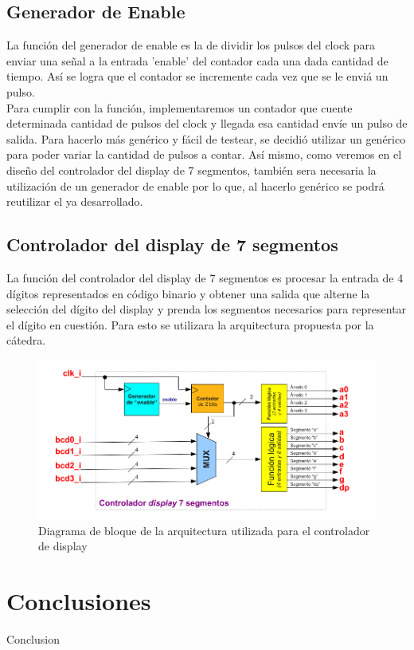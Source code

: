 \documentclass[a4paper,10pt]{article}
\begin{document}
	\subsection{Generador de Enable}
	La función del generador de enable es la de dividir los pulsos del clock para enviar una señal a la entrada 'enable' del contador cada una dada cantidad de tiempo. Así se logra que el contador se incremente cada vez que se le enviá un pulso. \\
	Para cumplir con la función, implementaremos un contador que cuente determinada cantidad de pulsos del clock y llegada esa cantidad envíe un pulso de salida. Para hacerlo más genérico y fácil de testear, se decidió utilizar un genérico para poder variar la cantidad de pulsos a contar. Así mismo, como veremos en el diseño del controlador del display de 7 segmentos, también sera necesaria la utilización de un generador de enable por lo que, al hacerlo genérico se podrá reutilizar el ya desarrollado.
	\subsection{Controlador del display de 7 segmentos}
	La función del controlador del display de 7 segmentos es procesar la entrada de 4 dígitos representados en código binario y obtener una salida que alterne la selección del dígito del display y prenda los segmentos necesarios para representar el dígito en cuestión. Para esto se utilizara la arquitectura propuesta por la cátedra.
		\begin{figure}[H]
			\centering
			\includegraphics[scale=0.5]{diagBloques_contr.png}
			\caption{Diagrama de bloque de la arquitectura utilizada para el controlador de display}
			\label{fig:diag_contr}
		\end{figure}

\section{Conclusiones}
Conclusion
\end{document}
